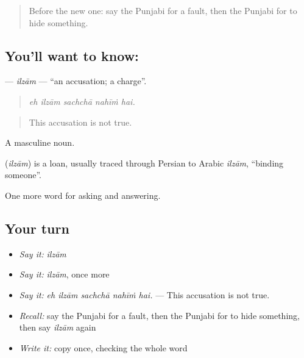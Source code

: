 \begin{quote}
Before the new one: say the Punjabi for a fault, then the Punjabi for to hide something.
\end{quote}

\subsection*{You'll want to know: }
\textbf{} — \emph{ilzām} — \textquotedblleft{}an accusation; a charge\textquotedblright{}.

\begin{quote}
    
\end{quote}

\begin{quote}
\emph{eh ilzām sachchā nahīṁ hai.}
\end{quote}

\begin{quote}
This accusation is not true.
\end{quote}

A masculine noun.

\begin{cousinweb}
\textbf{} (\emph{ilzām}) is a loan, usually traced through Persian to Arabic \emph{ilzām}, \textquotedblleft{}binding someone\textquotedblright{}.
\end{cousinweb}

\begin{grammarlens}[title={What you've built}]
One more word for asking and answering.
\end{grammarlens}

\subsection*{Your turn}
\begin{itemize}
\raggedright
  \item \emph{Say it:} \emph{ilzām}
  \item \emph{Say it:} \emph{ilzām}, once more
  \item \emph{Say it:} \emph{eh ilzām sachchā nahīṁ hai.} — This accusation is not true.
  \item \emph{Recall:} say the Punjabi for a fault, then the Punjabi for to hide something, then say \emph{ilzām} again
  \item \emph{Write it:} copy \textbf{} once, checking the whole word
\end{itemize}

